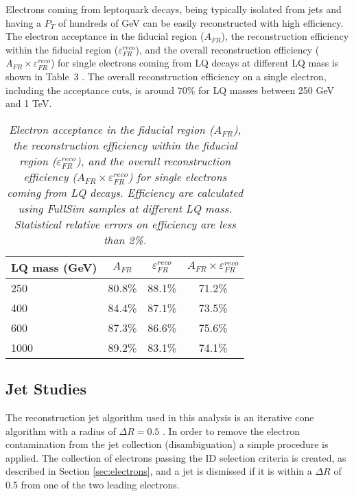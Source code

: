 \documentclass{cmspaper}
\begin{document}
\begin{linenumbers}
Electrons coming from leptoquark decays, 
being typically isolated from jets and having a $P_{T}$ of hundreds of GeV can be easily reconstructed with high efficiency. 
The electron acceptance in the fiducial region ($A_{FR}$), the 
reconstruction efficiency within the fiducial region ($\varepsilon_{FR}^{reco}$), and the overall reconstruction efficiency 
($A_{FR} \times \varepsilon_{FR}^{reco}$) for single electrons coming from LQ decays at different LQ mass is shown in Table~3
.
The overall reconstruction efficiency on a single electron, including the acceptance cuts, is around $70\%$ for LQ masses between 250 GeV and 1 TeV.

\begin{table}[htb]
  \label{tab:ElecEffAcc}
  \begin{center}
    \begin{tabular}{|l|c|c|c|} \hline
      LQ mass (GeV) & $A_{FR}$ & $\varepsilon_{FR}^{reco}$ & $A_{FR} \times \varepsilon_{FR}^{reco}$\\ \hline
      250 & 80.8\% & 88.1\% & 71.2\% \\ \hline
      400 & 84.4\% & 87.1\% & 73.5\% \\ \hline
      600 & 87.3\% & 86.6\% & 75.6\% \\ \hline
      1000 & 89.2\% & 83.1\% & 74.1\% \\ \hline
    \end{tabular}
    \caption{\small \sl Electron acceptance in the fiducial region ($A_{FR}$), the 
      reconstruction efficiency within the fiducial region ($\varepsilon_{FR}^{reco}$), and the overall reconstruction efficiency 
      ($A_{FR} \times \varepsilon_{FR}^{reco}$) for single electrons coming from LQ decays. Efficiency are 
      calculated using FullSim samples at different LQ mass. Statistical relative errors on efficiency are less than 2\%.}
  \end{center}
\end{table}

\subsection{Jet Studies} \label{sec:jet}

The reconstruction jet algorithm used in this analysis is an iterative cone algorithm with a radius of $\Delta R=0.5$ \cite{JetAlg}.  
In order to remove the electron contamination from the jet collection (disambiguation) a simple procedure is applied.  The collection 
of electrons passing the ID selection criteria is created, 
as described in Section \ref{sec:electrons}, and a jet is dismissed if it is within 
a $\Delta R$ of 0.5 from one of the two leading electrons. 


\end{linenumbers}
\end{document}
